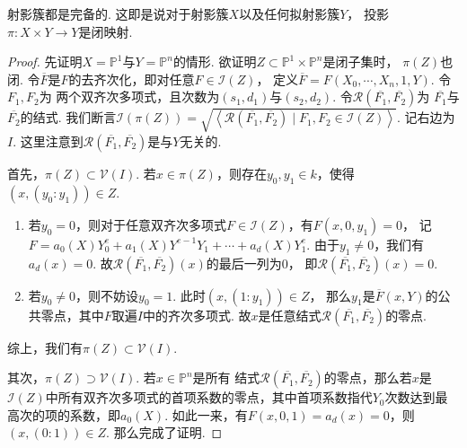     \begin{theorem}
        射影簇都是完备的. 这即是说对于射影簇$X$以及任何拟射影簇$Y$，
        投影$\pi\colon X \times Y \rightarrow Y$是闭映射.
    \end{theorem}
    \begin{proof}
        先证明$X = \mathbb{P}^{1}$与$Y = \mathbb{P}^{n}$的情形. 
        欲证明$Z \subset \mathbb{P}^{1} \times \mathbb{P}^{n}$是闭子集时，
        $\pi(Z)$也闭. 令$\overline{F}$是$F$的去齐次化，即对任意$F \in \mathcal{I}(Z)$，
        定义$\overline{F}=F(X_{0},\cdots,X_{n},1,Y)$. 令$F_{1},F_{2}$为
        两个双齐次多项式，且次数为$(s_{1},d_{1})$与$(s_{2},d_{2})$.
        令$\mathcal{R}(\overline{F_{1}},\overline{F_{2}})$为
        $\overline{F_{1}}$与$\overline{F_{2}}$的结式. 
        我们断言$\mathcal{I}(\pi(Z))=
        \sqrt{\left<\mathcal{R}(\overline{F_{1}},\overline{F_{2}}) \mid F_{1},F_{2} \in \mathcal{I}(Z)\right>}$. 记右边为$I$. 
        这里注意到$\mathcal{R}(\overline{F_{1}},\overline{F_{2}})$是与$Y$无关的.
        
        首先，$\pi(Z)\subset \mathcal{V}(I)$. 若$x \in \pi(Z)$，则存在$y_{0},y_{1} \in k$，使得$(x,(y_{0}:y_{1}))\in Z$.
        \begin{enumerate}
            \item[(1)] 若$y_{0}=0$，则对于任意双齐次多项式$F \in \mathcal{I}(Z)$，有$F(x,0,y_{1})=0$，
                       记$F=a_{0}(X)Y_{0}^{e}+a_{1}(X)Y^{e-1}Y_{1}+\cdots+a_{d}(X)Y_{1}^{e}$. 
                       由于$y_{1}\neq 0$，我们有$a_{d}(x) = 0$.
                       故$\mathcal{R}(\overline{F_{1}},\overline{F_{2}})(x)$的最后一列为$0$，
                       即$\mathcal{R}(\overline{F_{1}},\overline{F_{2}})(x)=0$. 
            \item[(2)] 若$y_{0} \neq 0$，则不妨设$y_{0}=1$.
                       此时$(x,(1:y_{1})) \in Z$，
                       那么$y_{1}$是$\overline{F}(x,Y)$的公共零点，其中$F$取遍$I$中的齐次多项式.
                       故$x$是任意结式$\mathcal{R}(\overline{F_{1}},\overline{F_{2}})$的零点.
        \end{enumerate}
        综上，我们有$\pi(Z)\subset \mathcal{V}(I)$.

        其次，$\pi(Z)\supset \mathcal{V}(I)$. 若$x\in \mathbb{P}^{n}$是所有
        结式$\mathcal{R}(\overline{F_{1}},\overline{F_{2}})$的零点，那么若$x$是
        $\mathcal{I}(Z)$中所有双齐次多项式的首项系数的零点，其中首项系数指代$Y_{0}$次数达到最高次的项的系数，即$a_{0}(X)$.
        如此一来，有$F(x,0,1)=a_{d}(x)=0$，则$(x,(0:1)) \in Z$. 那么完成了证明.


\end{proof}
